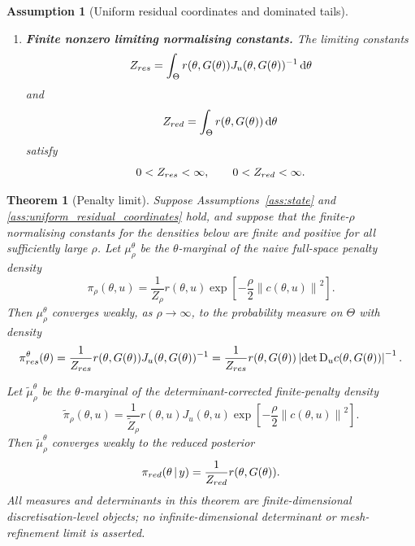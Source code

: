\documentclass[10pt,a4paper]{amsart}
\newtheorem{assumption}{Assumption}
\newtheorem{theorem}{Theorem}
\newcommand{\D}{\mathrm{D}}
\newcommand{\abs}[1]{\left\lvert #1\right\rvert}
\newcommand{\dd}{\,\mathrm{d}}
\newcommand{\given}{\,|\,}
\newcommand{\norm}[1]{\left\lVert #1\right\rVert}
\begin{document}
\begin{assumption}[Uniform residual coordinates and dominated tails]
\begin{enumerate}[leftmargin=*]
 \item \textbf{Finite nonzero limiting normalising constants.}
 The limiting constants
 \begin{equation}
  Z_{\rm res}
   =
  \int_\Theta
  r(\theta,G(\theta))
  J_u(\theta,G(\theta))^{-1}
  \dd\theta
  \label{eq:Z_res_explicit}
 \end{equation}
 and
 \begin{equation}
  Z_{\rm red}
  =
  \int_\Theta
  r(\theta,G(\theta))
  \dd\theta
  \label{eq:Z_red_explicit}
 \end{equation}
 satisfy
 \[
  0<Z_{\rm res}<\infty,
  \qquad
  0<Z_{\rm red}<\infty.
 \]
\end{enumerate}
\end{assumption}

\begin{theorem}[Penalty limit]
\label{thm:penalty_limit}
Suppose Assumptions~\ref{ass:state} and \ref{ass:uniform_residual_coordinates} hold, and suppose that the finite-\(\rho\) normalising constants for the densities below are finite and positive for all sufficiently large \(\rho\). Let \(\mu_\rho^\theta\) be the \(\theta\)-marginal of the naive full-space penalty density
\begin{equation}
 \pi_\rho(\theta,u)
 =
 \frac{1}{Z_\rho}
 r(\theta,u)
 \exp\!\left[-\frac{\rho}{2}\norm{c(\theta,u)}^2\right].
 \label{eq:pi_rho_revised}
\end{equation}
Then \(\mu_\rho^\theta\) converges weakly, as \(\rho\to\infty\), to the probability measure on \(\Theta\) with density
\begin{equation}
 \pi^\theta_{\rm res}(\theta)
 =
 \frac{1}{Z_{\rm res}}
 r(\theta,G(\theta))
 J_u(\theta,G(\theta))^{-1}
 =
 \frac{1}{Z_{\rm res}}
 r(\theta,G(\theta))
 \abs{\det\D_u c(\theta,G(\theta))}^{-1}.
 \label{eq:res_limit_density}
\end{equation}

Let \(\widetilde\mu_\rho^\theta\) be the \(\theta\)-marginal of the determinant-corrected finite-penalty density
\begin{equation}
 \widetilde{\pi}_\rho(\theta,u)
 =
 \frac{1}{\widetilde Z_\rho}
 r(\theta,u)
 J_u(\theta,u)
 \exp\!\left[-\frac{\rho}{2}\norm{c(\theta,u)}^2\right].
 \label{eq:corrected_pi_rho}
\end{equation}
Then \(\widetilde\mu_\rho^\theta\) converges weakly to the reduced posterior
\begin{equation}
 \pi_{\rm red}(\theta\given y)
 =
 \frac{1}{Z_{\rm red}}r(\theta,G(\theta)).
 \label{eq:corrected_limit_density_revised}
\end{equation}
All measures and determinants in this theorem are finite-dimensional discretisation-level objects; no infinite-dimensional determinant or mesh-refinement limit is asserted.
\end{theorem}
\end{document}
